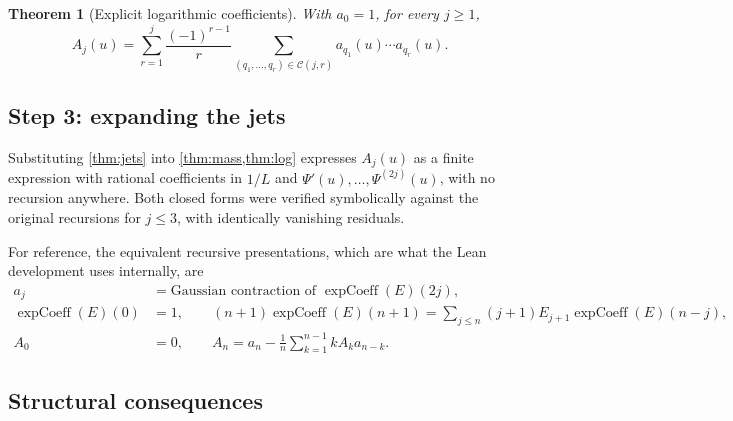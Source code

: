\documentclass[11pt,oneside]{article}
\newtheorem{theorem}{Theorem}[section]
\theoremstyle{definition}
\theoremstyle{remark}
\begin{document}
\begin{theorem}[Explicit logarithmic coefficients]\label{thm:log}
With $a_0=1$, for every $j\ge1$,
\[
  A_j(u)=\sum_{r=1}^{j}\frac{(-1)^{r-1}}{r}
    \sum_{(q_1,\dots,q_r)\in\mathcal C(j,r)}a_{q_1}(u)\cdots a_{q_r}(u).
\]
\end{theorem}

\subsection{Step 3: expanding the jets}

Substituting \cref{thm:jets} into \cref{thm:mass,thm:log} expresses $A_j(u)$ as
a finite expression with rational coefficients in $1/L$ and
$\Psi'(u),\dots,\Psi^{(2j)}(u)$, with no recursion anywhere.  Both closed forms
were verified symbolically against the original recursions for $j\le3$, with
identically vanishing residuals.

For reference, the equivalent recursive presentations, which are what the Lean
development uses internally, are
\[
\begin{aligned}
  a_j&=\text{Gaussian contraction of }\operatorname{expCoeff}(E)(2j),\\
  \operatorname{expCoeff}(E)(0)&=1,\qquad
  (n+1)\operatorname{expCoeff}(E)(n+1)
    =\sum_{j\le n}(j+1)E_{j+1}\operatorname{expCoeff}(E)(n-j),\\
  A_0&=0,\qquad A_n=a_n-\frac1n\sum_{k=1}^{n-1}kA_ka_{n-k}.
\end{aligned}
\]

\subsection{Structural consequences}
\end{document}
